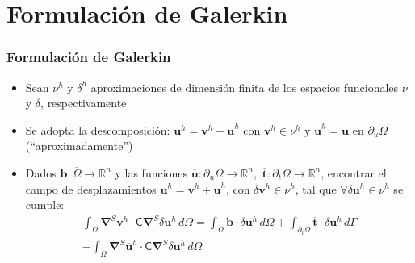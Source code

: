 \documentclass[handout]{beamer}
\begin{document}
\section{Formulación de Galerkin}
\begin{frame}
\frametitle{Formulación de Galerkin}
\begin{itemize}
\item Sean $\nu^h$ y $\delta^h$ aproximaciones de dimensión finita de los
espacios funcionales $\nu$ y $\delta$, respectivamente
\item Se adopta la descomposición: $\bm{u}^h=\bm{v}^h+\overline{\bm{u}}^h$
con $\bm{v}^h \in \nu^h$ y 
$\overline{\bm{u}}^h=\overline{\bm{u}}$ en $\partial_u \Omega$ (``aproximadamente'')
\item Dados $\bm{b}:\overline{\Omega}\rightarrow \mathbb{R}^n$ y las funciones
$\overline{\bm{u}}:\partial_u \Omega  \rightarrow \mathbb{R}^n$,\, 
$\overline{\bm{t}}:\partial_t \Omega  \rightarrow \mathbb{R}^n$, 
encontrar el campo de
desplazamientos $\bm{u}^h=\bm{v}^h+\overline{\bm{u}}^h$, con $\delta \bm{v}^h
\in \nu^h$, tal que
$\forall \delta \bm{u}^h \in \nu^h$ se cumple:
\begin{equation}
\begin{split}
\int_{\Omega}
\bm{\nabla}^{S} \bm{v}^h \cdot \bm{\mathsf{C}}
\bm{\nabla}^{S}\delta \bm{u}^h \, d \Omega
=\int_{\Omega} \bm{b} \cdot \delta \bm{u}^h \, d \Omega
+\int_{\partial_t \Omega} \overline{\bm{t}}\cdot
\delta \bm{u}^h \, d \Gamma \\
-\int_{\Omega} \bm{\nabla}^{S} \overline{\bm{u}}^h \cdot \bm{\mathsf{C}}
\bm{\nabla}^{S}\delta \bm{u}^h \, d \Omega
\end{split}
\label{ecvapr1}
\end{equation}
\end{itemize}
\end{frame}
\end{document}
